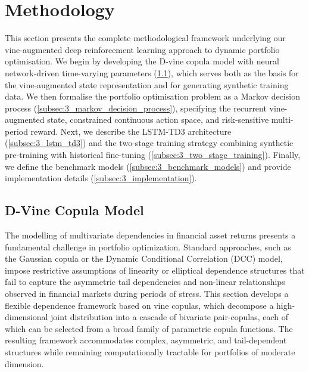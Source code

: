 \section{Methodology}
\label{sec:methodology}

This section presents the complete methodological framework underlying our vine-augmented deep reinforcement learning approach to dynamic portfolio optimisation. We begin by developing the D-vine copula model with neural network-driven time-varying parameters (\ref{subsec:3_Dvine_copula_model}), which serves both as the basis for the vine-augmented state representation and for generating synthetic training data. We then formalise the portfolio optimisation problem as a Markov decision process (\ref{subsec:3_markov_decision_process}), specifying the recurrent vine-augmented state, constrained continuous action space, and risk-sensitive multi-period reward. Next, we describe the LSTM-TD3 architecture (\ref{subsec:3_lstm_td3}) and the two-stage training strategy combining synthetic pre-training with historical fine-tuning (\ref{subsec:3_two_stage_training}). Finally, we define the benchmark models (\ref{subsec:3_benchmark_models}) and provide implementation details (\ref{subsec:3_implementation}).

\subsection{D-Vine Copula Model}
\label{subsec:3_Dvine_copula_model}

The modelling of multivariate dependencies in financial asset returns presents a fundamental challenge in portfolio optimization. Standard approaches, such as the Gaussian copula or the Dynamic Conditional Correlation (DCC) model, impose restrictive assumptions of linearity or elliptical dependence structures that fail to capture the asymmetric tail dependencies and non-linear relationships observed in financial markets during periods of stress. This section develops a flexible dependence framework based on vine copulas, which decompose a high-dimensional joint distribution into a cascade of bivariate pair-copulas, each of which can be selected from a broad family of parametric copula functions. The resulting framework accommodates complex, asymmetric, and tail-dependent structures while remaining computationally tractable for portfolios of moderate dimension.

